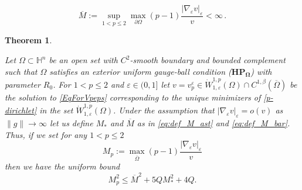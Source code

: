 \documentclass[10pt]{amsart}
\numberwithin{equation}{section}
\newtheorem{theorem}{Theorem}[section]
\theoremstyle{definition}
\newcommand{\He}{\mathbb{H}}
\begin{document}
\begin{equation}\label{eq:def_M_bar}
	\overline{M}:= \sup_{1<p\leq 2} \max_{\partial\Omega}(p-1)\dfrac{|\nabla_{\varepsilon}v|_{\varepsilon}}{v} <\infty \, .
\end{equation}



\begin{theorem}
\label{bd-interior-bound}

Let $\Omega \subset \He^n$ be an open set with $C^2$-smooth boundary and bounded complement such that $\Omega$ satisfies an exterior uniform gauge-ball condition ($\mathbf{HP_\Omega}$) with parameter $R_0$. For $1<p\leq 2$ and $\varepsilon \in (0,1]$ let $v=v_p^\varepsilon \in  \dot{W}^{1,p}_{1,\varepsilon}(\Omega) \cap C^{1,\beta}(\overline{\Omega})$ be the solution to \eqref{EqForVpeps} corresponding to the unique minimizers of \eqref{p-dirichlet}  
in the set $\dot{W}^{1,p}_{1, \varepsilon} (\Omega)$. 
Under the assumption that $|\nabla_\varepsilon  v |_\varepsilon=o(v)$ as $\| g\| \to \infty$ let us define $M_{\ast}$ and $\overline{M}$ as in \eqref{eq:def_M_ast} and \eqref{eq:def_M_bar}.
Thus, if we set for any $1<p\leq 2$
\begin{equation}\label{eq:def_M_p}
	M_p := \max_{\overline{\Omega}}(p-1)\dfrac{|\nabla_{\varepsilon}v|_{\varepsilon}}{v}
\end{equation}
then we have the uniform bound 
\begin{equation}\label{eq:stima_M_p}
M_{p}^{2} \leq \overline{M}^{2} + 5QM_{\ast}^2 + 4Q.
\end{equation}


\end{theorem}
\end{document}
